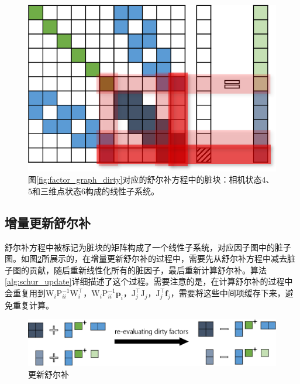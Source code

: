 

\begin{figure}[htb!]
    \centering
    \includegraphics[scale=1]{figs/normal_eq_dirty.png}
    \caption{图\ref{fig:factor_graph_dirty}对应的舒尔补方程中的脏块：相机状态$4$、$5$和三维点状态$6$构成的线性子系统。}
    \label{fig:normal_eq_dirty}
\end{figure}

\subsection{增量更新舒尔补}

舒尔补方程中被标记为脏块的矩阵构成了一个线性子系统，对应因子图中的脏子图。如图\ref{fig:schur_update}所展示的，在增量更新舒尔补的过程中，需要先从舒尔补方程中减去脏子图的贡献，随后重新线性化所有的脏因子，最后重新计算舒尔补。算法\ref{alg:schur_update}详细描述了这个过程。需要注意的是，在计算舒尔补的过程中会重复用到$\mathrm{W}_i\mathrm{P}_{ii}^{-1}\mathrm{W}_i^\top$，$\mathrm{W}_i\mathrm{P}_{ii}^{-1}\bm{p}_i$，$\mathrm{J}_j^\top\mathrm{J}_j$，$\mathrm{J}_j^\top\bm{f}_j$，需要将这些中间项缓存下来，避免重复计算。



\begin{figure}[htb!]
    \centering
    \includegraphics[width=\textwidth]{figs/schur_update.png}
    \caption{更新舒尔补}
    \label{fig:schur_update}
\end{figure}


